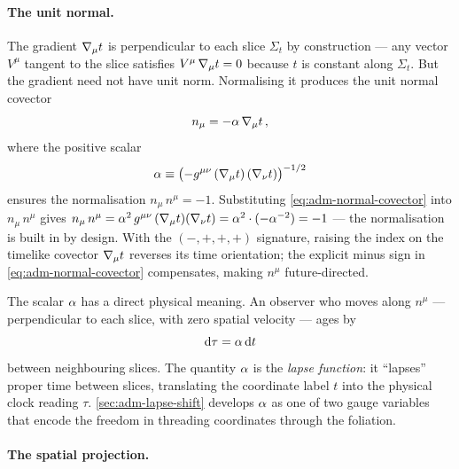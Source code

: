 \paragraph{The unit normal.}

The gradient $\nabla_{\mu} t$ is perpendicular to each slice $\Sigma_t$ by
construction --- any vector $V^\mu$ tangent to the slice satisfies
$V^\mu\,\nabla_{\mu} t = 0$ because $t$ is constant along $\Sigma_t$.  But
the gradient need not have unit norm.  Normalising it produces the unit
normal covector
%
\begin{equation}
  n_\mu = -\alpha\,\nabla_{\mu} t \,,
  \label{eq:adm-normal-covector}
\end{equation}
%
where the positive scalar
%
\begin{equation}
  \alpha \equiv \bigl(-g^{\mu\nu}\,(\nabla_{\mu} t)\,(\nabla_{\nu} t)
    \bigr)^{-1/2}
  \label{eq:adm-lapse-normalisation}
\end{equation}
%
ensures the normalisation $n_\mu\,n^\mu = -1$.  Substituting
\cref{eq:adm-normal-covector} into $n_\mu\,n^\mu$ gives
$n_\mu\,n^\mu = \alpha^2\,g^{\mu\nu}\,(\nabla_{\mu} t)(\nabla_{\nu} t)
= \alpha^2 \cdot (-\alpha^{-2}) = -1$ --- the normalisation is built in
by design.  With the $(-,+,+,+)$ signature, raising the index on the
timelike covector $\nabla_{\mu} t$ reverses its time orientation; the explicit
minus sign in \cref{eq:adm-normal-covector} compensates, making $n^\mu$
future-directed.

The scalar $\alpha$ has a direct physical meaning.  An observer who moves
along $n^\mu$ --- perpendicular to each slice, with zero spatial velocity
--- ages by
%
\begin{equation}
  \mathrm{d}\tau = \alpha\,\mathrm{d} t
  \label{eq:adm-proper-time}
\end{equation}
%
between neighbouring slices.  The quantity $\alpha$ is the \emph{lapse
function}: it ``lapses'' proper time between slices, translating the
coordinate label $t$ into the physical clock reading $\tau$.
\cref{sec:adm-lapse-shift} develops $\alpha$ as one of two gauge variables
that encode the freedom in threading coordinates through the foliation.

\paragraph{The spatial projection.}

